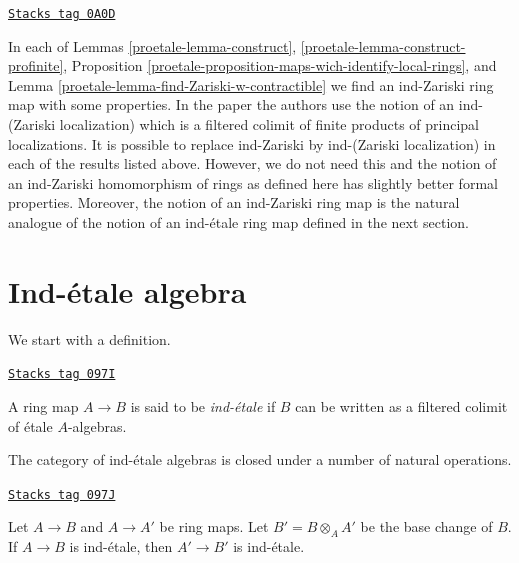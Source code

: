 \begin{remark}
\label{proetale-remark-slightly-stronger}
\href{https://stacks.math.columbia.edu/tag/0A0D}{\texttt{Stacks tag 0A0D}}

In each of Lemmas \ref{proetale-lemma-construct}, \ref{proetale-lemma-construct-profinite},
Proposition \ref{proetale-proposition-maps-wich-identify-local-rings}, and
Lemma \ref{proetale-lemma-find-Zariski-w-contractible} we find an ind-Zariski ring
map with some properties. In the paper \cite{BS} the authors use the notion
of an ind-(Zariski localization) which is a filtered colimit of finite
products of principal localizations. It is possible to replace ind-Zariski
by ind-(Zariski localization) in each of the results listed above.
However, we do not need this and the notion of an ind-Zariski homomorphism
of rings as defined here has slightly better formal properties. Moreover,
the notion of an ind-Zariski ring map is the natural analogue of the
notion of an ind-\'etale ring map defined in the next section.
\end{remark}

\section{Ind-\'etale algebra}
\label{proetale-section-ind-etale}
We start with a definition.

\begin{definition}
\label{proetale-definition-ind-etale}
\href{https://stacks.math.columbia.edu/tag/097I}{\texttt{Stacks tag 097I}}

A ring map $A \to B$ is said to be {\it ind-\'etale} if $B$ can be written
as a filtered colimit of \'etale $A$-algebras.
\end{definition}

The category of ind-\'etale algebras is closed under a number of natural
operations.

\begin{lemma}
\label{proetale-lemma-base-change-ind-etale}
\href{https://stacks.math.columbia.edu/tag/097J}{\texttt{Stacks tag 097J}}

Let $A \to B$ and $A \to A'$ be ring maps. Let $B' = B \otimes_A A'$
be the base change of $B$.
If $A \to B$ is ind-\'etale, then $A' \to B'$ is ind-\'etale.
\end{lemma}

